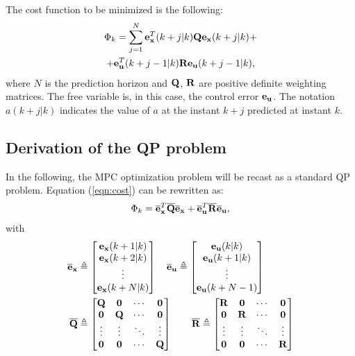 \documentclass[twocolumn]{IEEEtran} %
\begin{document}
The cost function to be minimized is the following:
\begin{multline}\label{eqn:cost}
	\Phi_k = \sum_{j=1}^{N}{\bf e}_{\bf x}^T(k+j|k){\bf Q}{\bf e}_{\bf x}(k+j|k) + \\ + {\bf e}_{\bf u}^T(k+j-1|k){\bf R}{\bf e}_{\bf u}(k+j-1|k),
\end{multline}
where $N$ is the prediction horizon and ${\bf Q}$, ${\bf R}$ are positive definite weighting matrices. The free variable is, in this case, the control error ${\bf e_u}$. The notation $a(k+j|k)$ indicates the value of $a$ at the instant $k+j$ predicted at instant $k$.

\subsection{Derivation of the QP problem}\label{sec:qp}
In the following, the MPC optimization problem will be recast as a standard QP problem. Equation (\ref{eqn:cost}) can be rewritten as:
\begin{equation}\label{eqn:cost2}
	\Phi_k = \overline{\bf e}_{\bf x}^T\overline{\bf Q}\overline{\bf e}_{\bf x} + \overline{\bf e}_{\bf u}^T\overline{\bf R}\overline{\bf e}_{\bf u},
\end{equation}
with
\begin{align*}
	\overline {\bf e}_{\bf x} &\triangleq \begin{bmatrix}
		{\bf e}_{\bf x}(k+1|k) \\ {\bf e}_{\bf x}(k+2|k) \\ \vdots \\ {\bf e}_{\bf x}(k+N|k) 
	\end{bmatrix} \quad
	\overline{\bf e}_{\bf u} \triangleq \begin{bmatrix}
		{\bf e_u}(k|k)  \\ {\bf e_u}(k+1|k) \\ \vdots \\ {\bf e_u}(k+N-1)
	\end{bmatrix} \\
	\overline {\bf Q} &\triangleq \begin{bmatrix}
		{\bf Q} & {\bf 0} & \cdots & {\bf 0} \\
		{\bf 0} & {\bf Q} & \cdots & {\bf 0} \\
		\vdots  & \vdots  & \ddots & \vdots  \\
		{\bf 0} & {\bf 0} & \cdots & {\bf Q} \\
	\end{bmatrix} \qquad
	\overline {\bf R} \triangleq \begin{bmatrix}
		{\bf R} & {\bf 0} & \cdots & {\bf 0} \\
		{\bf 0} & {\bf R} & \cdots & {\bf 0} \\
		\vdots  & \vdots  & \ddots & \vdots  \\
		{\bf 0} & {\bf 0} & \cdots & {\bf R} \\
	\end{bmatrix}
\end{align*}
\end{document}
